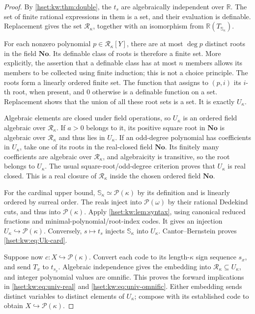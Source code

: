 \documentclass[11pt,letterpaper]{article}
\theoremstyle{definition}
\theoremstyle{remark}
\newcommand{\No}{\mathbf{No}}
\newcommand{\Pow}{\mathcal P}
\newcommand{\R}{\mathbb R}
\begin{document}
\begin{proof}
By \cref{hset:kw:thm:double}, the $t_s$ are algebraically independent over $\R$. The set of finite rational expressions in them is a set, and their evaluation is definable. Replacement gives the set $\mathcal R_\kappa$, together with an isomorphism from $\R(T_{\mathbb S_\kappa})$.

For each nonzero polynomial $p\in \mathcal R_\kappa[Y]$, there are at most $\deg p$ distinct roots in the field $\No$. Its definable class of roots is therefore a finite set. More explicitly, the assertion that a definable class has at most $n$ members allows its members to be collected using finite induction; this is not a choice principle. The roots form a linearly ordered finite set. The function that assigns to $(p,i)$ its $i$-th root, when present, and $0$ otherwise is a definable function on a set. Replacement shows that the union of all these root sets is a set. It is exactly $U_\kappa$.

Algebraic elements are closed under field operations, so $U_\kappa$ is an ordered field algebraic over $\mathcal R_\kappa$. If $a>0$ belongs to it, its positive square root in $\No$ is algebraic over $\mathcal R_\kappa$ and thus lies in $U_\kappa$. If an odd-degree polynomial has coefficients in $U_\kappa$, take one of its roots in the real-closed field $\No$. Its finitely many coefficients are algebraic over $\mathcal R_\kappa$, and algebraicity is transitive, so the root belongs to $U_\kappa$. The usual square-root/odd-degree criterion proves that $U_\kappa$ is real closed. This is a real closure of $\mathcal R_\kappa$ inside the chosen ordered field $\No$.

For the cardinal upper bound, $\mathbb S_\kappa\simeq\Pow(\kappa)$ by its definition and is linearly ordered by surreal order. The reals inject into $\Pow(\omega)$ by their rational Dedekind cuts, and thus into $\Pow(\kappa)$. Apply \cref{hset:kw:lem:syntax}, using canonical reduced fractions and minimal-polynomial/root-index codes. It gives an injection $U_\kappa\hookrightarrow\Pow(\kappa)$. Conversely, $s\mapsto t_s$ injects $\mathbb S_\kappa$ into $U_\kappa$. Cantor--Bernstein proves \eqref{hset:kw:eq:Uk-card}.

Suppose now $c:X\hookrightarrow\Pow(\kappa)$. Convert each code to its length-$\kappa$ sign sequence $s_x$, and send $T_x$ to $t_{s_x}$. Algebraic independence gives the embedding into $\mathcal R_\kappa\subseteq U_\kappa$, and integer polynomial values are omnific. This proves the forward implications in \eqref{hset:kw:eq:univ-real} and \eqref{hset:kw:eq:univ-omnific}. Either embedding sends distinct variables to distinct elements of $U_\kappa$; compose with its established code to obtain $X\hookrightarrow\Pow(\kappa)$.
\end{proof}
\end{document}
